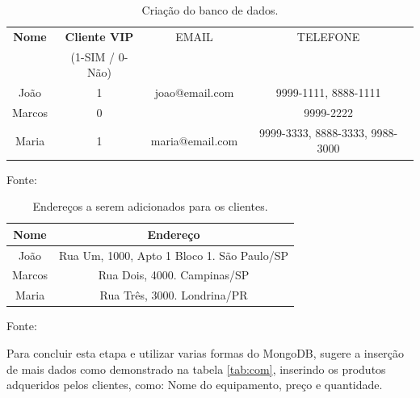 \begin{table}[H]
\center
  \caption{Criação do banco de dados.}
  \begin{tabular}{ | c | c  | c | c |}
      \hline
      \textbf{Nome} & \textbf{Cliente VIP} & EMAIL & TELEFONE \\
          & (1-SIM / 0-Não)  &  &    \\
      \hline
          João & 1 & joao@email.com & 9999-1111, 8888-1111 \\
      \hline
          Marcos & 0 &  & 9999-2222 \\
      \hline
          Maria & 1 &maria@email.com & 9999-3333, 8888-3333, 9988-3000 \\
      \hline
  \end{tabular}
  \label{tab:banco}
  \flushleft %

  {\fontsize{10pt}{\baselineskip}\selectfont
    Fonte: }
\end{table}
\begin{table}[H]
  \caption{Endereços a serem adicionados para os clientes.}
  \center
  \begin{tabular}{ | c | c |}
      \hline
      \textbf{Nome} & \textbf{Endereço} \\
      \hline
          João & Rua Um, 1000, Apto 1 Bloco 1. São Paulo/SP \\
      \hline
          Marcos & Rua Dois, 4000. Campinas/SP \\
      \hline
          Maria & Rua Três, 3000. Londrina/PR \\
      \hline
  \end{tabular}
  \label{tab:end}
  \flushleft %

  {\fontsize{10pt}{\baselineskip}\selectfont
    Fonte: }
\end{table}
\par Para concluir esta etapa e utilizar varias formas do MongoDB, sugere a inserção de mais dados como demonstrado na tabela \ref{tab:com}, inserindo os produtos adqueridos pelos clientes, como: Nome do equipamento, preço e quantidade.


